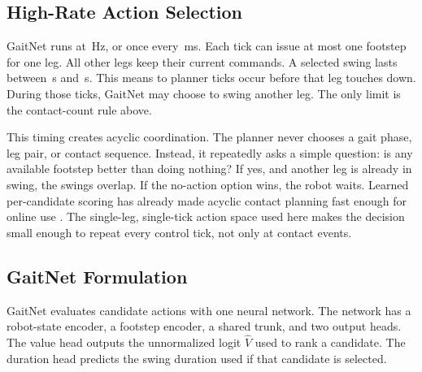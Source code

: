\subsection{High-Rate Action Selection}
\label{subsec:methodology-high-rate-selection}

GaitNet runs at \corlControlHz\,Hz, or once every
\corlControlTickMs\,ms. Each tick can issue at most one footstep for
one leg. All other legs keep their current commands. A selected swing
lasts between \corlSwingDurationMin\,s and
\corlSwingDurationMax\,s. This means
\numberstringnum{\corlMinTicksPerSwing} to
\numberstringnum{\corlMaxTicksPerSwing} planner ticks occur before
that leg touches down. During those ticks, GaitNet may choose to
swing another leg. The only limit is the contact-count rule above.

This timing creates acyclic coordination. The planner never chooses a
gait phase, leg pair, or contact sequence. Instead, it repeatedly asks
a simple question: is any available footstep better than doing
nothing? If yes, and another leg is already in swing, the swings
overlap. If the no-action option wins, the robot waits.
Learned per-candidate scoring has already made acyclic
contact planning fast enough for online use
\cite{bratta_contactnet_2024, taouil_non-gaited_2024}. The
single-leg, single-tick action space used here makes the decision
small enough to repeat every control tick, not only at contact
events.

\subsection{GaitNet Formulation}
\label{subsec:methodology-gaitnet-architecture}

GaitNet evaluates candidate actions with one neural network. The
network has a robot-state encoder, a footstep encoder, a shared trunk,
and two output heads. The value head outputs the unnormalized logit
$\hat{V}$ used to rank a candidate. The duration head predicts the
swing duration used if that candidate is selected.

